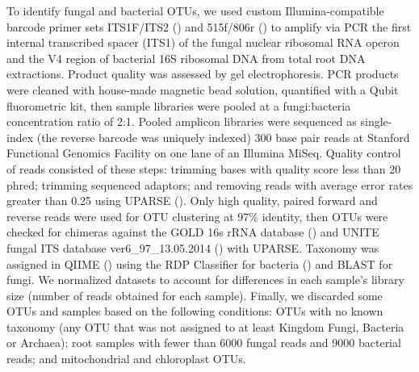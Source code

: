 \documentclass[11pt]{article}
\begin{document}
To identify fungal and bacterial OTUs, we used custom
Illumina-compatible barcode primer sets ITS1F/ITS2 (\citealt{white1990amplification, smith2014sequence}) and 515f/806r
(\citealt{Caporaso_2012}) to amplify via PCR the first internal transcribed spacer (ITS1) of the fungal nuclear ribosomal RNA operon and the V4 region of bacterial 16S ribosomal DNA
from total root DNA extractions. Product quality was assessed by gel
electrophoresis. PCR products were cleaned with house-made magnetic bead
solution, quantified with a Qubit fluorometric kit, then sample
libraries were pooled at a fungi:bacteria concentration ratio of 2:1.
Pooled amplicon libraries were sequenced as single-index (the reverse
barcode was uniquely indexed) 300 base pair reads at Stanford Functional
Genomics Facility on one lane of an Illumina MiSeq. Quality control of
reads consisted of these steps: trimming bases with quality score less
than 20 phred; trimming sequenced adaptors; and removing reads with
average error rates greater than 0.25 using UPARSE (\citealt{Edgar_2013}).
Only high quality, paired forward and reverse reads were used for OTU
clustering at 97\% identity, then OTUs were checked for chimeras against
the GOLD 16s rRNA database (\citealt{reddy2014genomes}) and UNITE fungal ITS
database ver6\_97\_13.05.2014 (\citealt{koljalg2005unite}) with UPARSE. Taxonomy was
assigned in QIIME (\citealt{Caporaso_2010}) using the RDP Classifier for bacteria (\citealt{wang2007naive}) and BLAST for fungi. We normalized datasets
to account for differences in each sample's library size (number of
reads obtained for each sample). Finally, we discarded some OTUs and
samples based on the following conditions: OTUs with no known taxonomy
(any OTU that was not assigned to at least Kingdom Fungi, Bacteria or
Archaea); root samples with fewer than 6000 fungal reads and 9000
bacterial reads; and mitochondrial and chloroplast OTUs.
\end{document}
